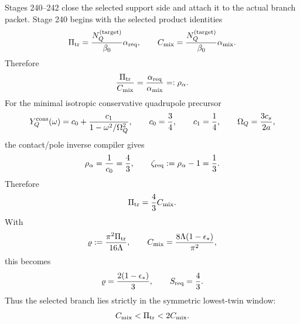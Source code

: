 Stages 240--242 close the selected support side and attach it to the actual branch packet.  Stage 240 begins with the selected product identities
\begin{equation}
\label{eq:part07-selected-product-identities}
\Pi_{\rm tr}=\frac{N_Q^{(\rm target)}}{\beta_0}\alpha_{\rm req},
\qquad
C_{\rm mix}=\frac{N_Q^{(\rm target)}}{\beta_0}\alpha_{\rm mix}.
\end{equation}
Therefore
\begin{equation}
\label{eq:part07-rho-alpha-ratio}
\frac{\Pi_{\rm tr}}{C_{\rm mix}}
=\frac{\alpha_{\rm req}}{\alpha_{\rm mix}}
=:\rho_\alpha.
\end{equation}
For the minimal isotropic conservative quadrupole precursor
\begin{equation}
\label{eq:part07-minimal-quadrupole-precursor}
Y_Q^{\rm cons}(\omega)
=c_0+\frac{c_1}{1-\omega^2/\Omega_Q^2},
\qquad
c_0=\frac34,
\qquad
c_1=\frac14,
\qquad
\Omega_Q=\frac{3c_s}{2a},
\end{equation}
the contact/pole inverse compiler gives
\begin{equation}
\label{eq:part07-rho-alpha-zeta-req}
\rho_\alpha=\frac1{c_0}=\frac43,
\qquad
\zeta_{\rm req}:=\rho_\alpha-1=\frac13.
\end{equation}
Therefore
\begin{equation}
\label{eq:part07-pi-tr-four-thirds}
\Pi_{\rm tr}=\frac43 C_{\rm mix}.
\end{equation}
With
\begin{equation}
\label{eq:part07-varrho-selector}
\varrho:=\frac{\pi^2\Pi_{\rm tr}}{16\Lambda},
\qquad
C_{\rm mix}=\frac{8\Lambda(1-\epsilon_*)}{\pi^2},
\end{equation}
this becomes
\begin{equation}
\label{eq:part07-varrho-selected}
\varrho=\frac{2(1-\epsilon_*)}{3},
\qquad
S_{\rm req}=\frac43.
\end{equation}
Thus the selected branch lies strictly in the symmetric lowest-twin window:
\begin{equation}
\label{eq:part07-twin-window}
C_{\rm mix}<\Pi_{\rm tr}<2C_{\rm mix}.
\end{equation}

